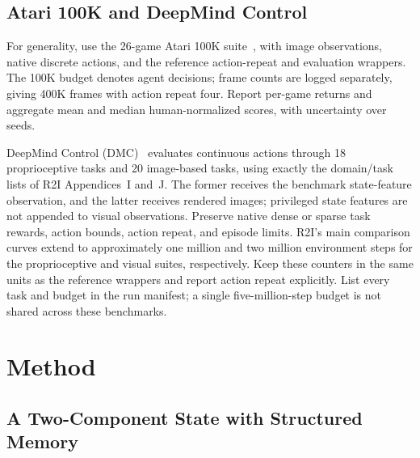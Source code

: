 \documentclass{article}
\begin{document}
\subsection{Atari 100K and DeepMind Control}

For generality, use the 26-game Atari 100K suite~\cite{kaiser2020atari}, with image observations, native discrete actions, and the reference action-repeat and evaluation wrappers. The 100K budget denotes agent decisions; frame counts are logged separately, giving 400K frames with action repeat four. Report per-game returns and aggregate mean and median human-normalized scores, with uncertainty over seeds.

DeepMind Control (DMC)~\cite{tassa2018control} evaluates continuous actions through 18 proprioceptive tasks and 20 image-based tasks, using exactly the domain/task lists of R2I Appendices~I and~J. The former receives the benchmark state-feature observation, and the latter receives rendered images; privileged state features are not appended to visual observations. Preserve native dense or sparse task rewards, action bounds, action repeat, and episode limits. R2I's main comparison curves extend to approximately one million and two million environment steps for the proprioceptive and visual suites, respectively. Keep these counters in the same units as the reference wrappers and report action repeat explicitly. List every task and budget in the run manifest; a single five-million-step budget is not shared across these benchmarks.

\section{Method}

\subsection{A Two-Component State with Structured Memory}
\end{document}
